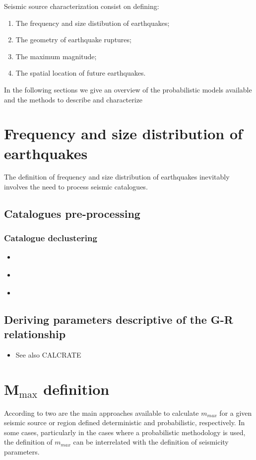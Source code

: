 Seismic source characterization consist on defining: 
\begin{enumerate}
\item The frequency and size distibution of earthquakes;
\item The geometry of earthquake ruptures;
\item The maximum magnitude;
\item The spatial location of future earthquakes.
\end{enumerate}
In the following sections we give an overview of the probabilistic models 
available and the methods to describe and characterize 
%
\newpage
\section{Frequency and size distribution of earthquakes}
The definition of frequency and size distribution of earthquakes inevitably 
involves the need to process seismic catalogues. 
%
\subsection{Catalogues pre-processing}
%
\subsubsection{Catalogue declustering}
\begin{itemize}
\item \cite{gardner74}
\item \cite{reasenberg85}
\item \cite{kagan10}
\end{itemize}
%
\subsection{Deriving parameters descriptive of the G-R relationship}
\begin{itemize}
\item \cite{weichert80}
See also CALCRATE \citep{bender87,hanson92}
\end{itemize}
%
\newpage
\section{M$_{\text{max}}$ definition}
According to \cite{kijko04} two are the main approaches available to calculate 
$m_{max}$ for a given seismic source or region defined deterministic and 
probabilistic, respectively.
%
In some cases, particularly in the cases where a probabilistic methodology is used, 
the definition of $m_{max}$ can be interrelated with the definition of seismicity 
parameters.
%

